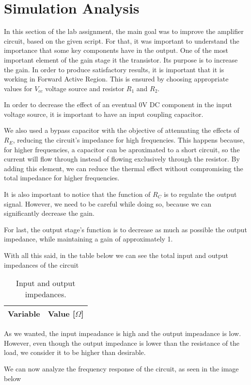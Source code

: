 \section{Simulation Analysis}
\label{sec:simulation}

In this section of the lab assignment, the main goal was to improve the amplifier circuit, based on the given script. For that, it was important to understand the importance that some key components have in the output. One of the most important element of the gain stage it the transistor. Its purpose is to increase the gain. In order to produce satisfactory results, it is important that it is working in Forward Active Region. This is ensured by choosing appropriate values for $V_{cc}$ voltage source and resistor $R_1$ and $R_2$.
\par
In order to decrease the effect of an eventual 0V DC component in the input voltage source, it is important to have an input coupling capacitor.
\par
We also used a bypass capacitor with the objective of attenuating the effects of $R_E$, reducing the circuit's impedance for high frequencies. This happens because, for higher frequencies, a capacitor can be aproximated to a short circuit, so the current will flow through instead of flowing exclusively through the resistor. By adding this element, we can reduce the thermal effect without compromising the total impedance for higher frequencies.
\par
It is also important to notice that the function of $R_C$ is to regulate the output signal. However, we need to be careful while doing so, because we can significantly decrease the gain.
\par
For last, the output stage's function is to decrease as much as possible the output impedance, while maintaining a gain of approximately 1.
\par
With all this said, in the table below we can see the total input and output impedances of the circuit

\begin{table}[H]
  \centering
  \begin{tabular}{|l|r|}
    \hline    
    {\bf Variable} & {\bf Value [$\Omega$]} \\ \hline
    
    
  \end{tabular}
  \caption{Input and output impedances.}
  \label{tab:sim1}
\end{table}

As we wanted, the input impeadance is high and the output impeadance is low. However, even though the output impedance is lower than the resistance of the load, we consider it to be higher than desirable.
\par
We can now analyze the frequency response of the circuit, as seen in the image below

